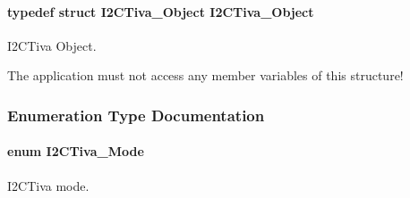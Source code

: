 \paragraph[{I2\+C\+Tiva\+\_\+\+Object}]{\setlength{\rightskip}{0pt plus 5cm}typedef struct {\bf I2\+C\+Tiva\+\_\+\+Object}  {\bf I2\+C\+Tiva\+\_\+\+Object}}\label{_i2_c_tiva_8h_a56bbf0bf756fabe1c1c6b905a1b88ee7}


I2\+C\+Tiva Object. 

The application must not access any member variables of this structure! 

\subsubsection{Enumeration Type Documentation}
\paragraph[{I2\+C\+Tiva\+\_\+\+Mode}]{\setlength{\rightskip}{0pt plus 5cm}enum {\bf I2\+C\+Tiva\+\_\+\+Mode}}\label{_i2_c_tiva_8h_ab6fdad6d12d7ec02e2acb6fbc1ab85af}


I2\+C\+Tiva mode. 

